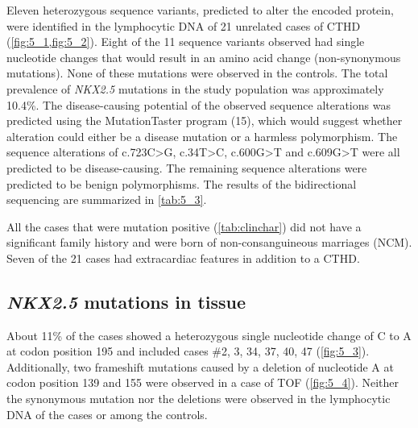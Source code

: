 \begin{refsection}
Eleven heterozygous sequence variants, predicted to alter the encoded protein, were identified in the lymphocytic DNA of 21 unrelated cases of CTHD (\cref{fig:5_1,fig:5_2}). Eight of the 11 sequence variants observed had single nucleotide changes that would result in an amino acid change (non-synonymous mutations). None of these mutations were observed in the controls. The total prevalence of \textit{NKX2.5} mutations in the study population was approximately 10.4\%. 
The disease-causing potential of the observed sequence alterations was predicted using the MutationTaster program (15), which would suggest whether alteration could either be a disease mutation or a harmless polymorphism. The sequence alterations of c.723C>G, c.34T>C, c.600G>T and c.609G>T were all predicted to be disease-causing. The remaining sequence alterations were predicted to be benign polymorphisms. The results of the bidirectional sequencing are summarized in \cref{tab:5_3}.



All the cases that were mutation positive (\cref{tab:clinchar}) did not have a significant family history and were born of non-consanguineous marriages (NCM). Seven of the 21 cases had extracardiac features in addition to a CTHD.

\subsection{\textit{NKX2.5} mutations in tissue}

About 11\% of the cases showed a heterozygous single nucleotide change of C to A at codon position 195 and included cases \#2, 3, 34, 37, 40, 47 (\cref{fig:5_3}). Additionally, two frameshift mutations caused by a deletion of nucleotide A at codon position 139 and 155 were observed in a case of TOF (\cref{fig:5_4}). Neither the synonymous mutation nor the deletions were observed in the lymphocytic DNA of the cases or among the controls.


\end{refsection}
